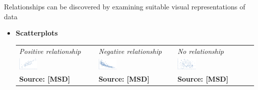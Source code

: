 Relationships can be discovered by examining suitable visual representations of data
\begin{itemize}
\item \textbf{Scatterplots}

  \oneex
  \begin{tabular}{m{}m{}m{}}
  {\small \emph{Positive relationship}} & {\small \emph{Negative relationship}} &{\small \emph{No relationship}} \\
  \includegraphics[width=0.25\textwidth]{pos_rel_vis.png} &
  \includegraphics[width=0.25\textwidth]{neg_rel_vis.png} &
  \includegraphics[width=0.25\textwidth]{no_rel_vis.png} \\ [-1.5ex] 
    {\fontsize{10}{0}\selectfont \textbf{Source: [MSD]}} &
    {\fontsize{10}{0}\selectfont \textbf{Source: [MSD]}} &
    {\fontsize{10}{0}\selectfont \textbf{Source: [MSD]}} \\    
  \end{tabular}
  \newpage


\end{itemize}
